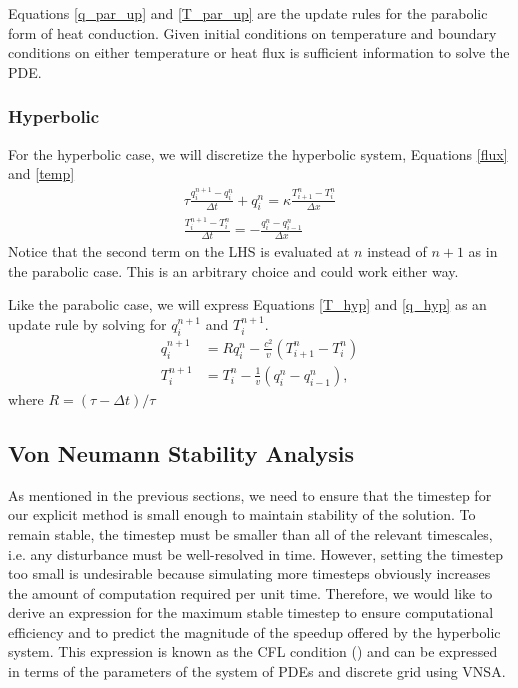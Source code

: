\documentclass[iop]{emulateapj}
\begin{document}
				Equations \ref{q_par_up} and \ref{T_par_up} are the update rules for the parabolic form of heat conduction. 
					Given initial conditions on temperature and boundary conditions on either temperature or heat flux is sufficient information to solve the \ac{PDE}.
					
			\subsubsection{Hyperbolic}
			
				For the hyperbolic case, we will discretize the hyperbolic system, Equations \ref{flux} and \ref{temp}
				\begin{gather}
					\tau \frac{q_i^{n+1} - q_i^n}{\Delta t} + q_i^n =  \kappa \frac{T_{i+1}^n - T_i^n}{\Delta x} \label{q_hyp} \\
					\frac{T_i^{n+1} - T_i^n}{\Delta t} = - \frac{q_i^n - q_{i-1}^n}{\Delta x} \label{T_hyp}
				\end{gather}
				Notice that the second term on the \ac{LHS} is evaluated at $n$ instead of $n+1$ as in the parabolic case.
					This is an arbitrary choice and could work either way.
					
				Like the parabolic case, we will express Equations \ref{T_hyp} and \ref{q_hyp} as an update rule by solving for $q_i^{n+1}$ and $T_i^{n+1}$.
				\begin{align}
					q_i^{n+1} &= R q_i^n - \frac{c^2}{v} \left( T_{i+1}^n - T_i^n \right) \\
					T_i^{n+1} &= T_i^n - \frac{1}{v} \left( q_i^n - q_{i-1}^n \right),
				\end{align}
				where $R = (\tau - \Delta t) / \tau$
			
		\subsection{Von Neumann Stability Analysis} \label{vnsa_sec}
		
			As mentioned in the previous sections, we need to ensure that the timestep for our explicit method is small enough to maintain stability of the solution.
				To remain stable, the timestep must be smaller than all of the relevant timescales, i.e. any disturbance must be well-resolved in time.
				However, setting the timestep too small is undesirable because simulating more timesteps obviously increases the amount of computation required per unit time.
				Therefore, we would like to derive an expression for the maximum stable timestep to ensure computational efficiency and to predict the magnitude of the speedup offered by the hyperbolic system.
				This expression is known as the \ac{CFL} condition (\cite{cfl}) and can be expressed in terms of the parameters of the system of \acp{PDE} and discrete grid using \ac{VNSA}.
		
\end{document}
